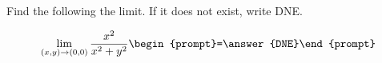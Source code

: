 \documentclass{ximera}
\author{David Guichard \and Neal Koblitz \and H. Jerome Keisler \and Albert Scheller \and Barry Balof \and Mike Wills \and Matthew Carr}
\begin{document}
\begin{exercise}




Find the following the limit. If it does not exist, write DNE. 

\[
\lim_{(x,y)\to(0,0)}\frac{x^2}{x^2+y^2}\begin{prompt}=\answer{DNE}\end{prompt}
\]

\end{exercise}
\end{document}

